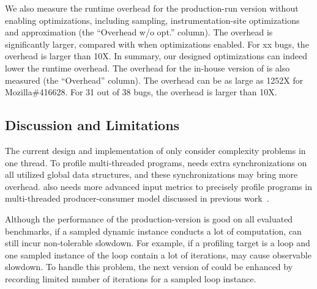 We also measure the runtime overhead for the production-run 
version without enabling optimizations, 
including sampling, instrumentation-site optimizations
and approximation (the ``Overhead w/o opt.'' column). 
The overhead is significantly larger, compared with when optimizations enabled. 
For xx  bugs, the overhead is larger than 10X. 
In summary, our designed optimizations can 
indeed lower the runtime overhead. 
The overhead for the in-house version 
of \Tool is also measured 
(the ``Overhead'' column). 
The overhead can be as large as 1252X for 
Mozilla\#416628.
For 31 out of 38 bugs, the overhead is larger than 10X. 


\subsection{Discussion and Limitations}

The current design and implementation of \Tool 
only consider complexity problems in one thread. 
To profile multi-threaded programs, 
\Tool needs extra synchronizations on all utilized global data structures, 
and these synchronizations may bring more overhead. 
\Tool also needs more advanced input metrics to precisely profile programs 
in multi-threaded producer-consumer 
model discussed in previous work~\cite{Aprof2}. 

Although the performance of the production-version 
is good on all evaluated benchmarks, 
if a sampled dynamic instance conducts a lot of computation, 
\Tool can still incur non-tolerable slowdown.
For example, if a profiling target is a loop and 
one sampled instance of the loop contain a lot of iterations, 
\Tool may cause observable slowdown. 
To handle this problem, the next version of \Tool could 
be enhanced by recording limited number of iterations for a sampled loop instance. 



